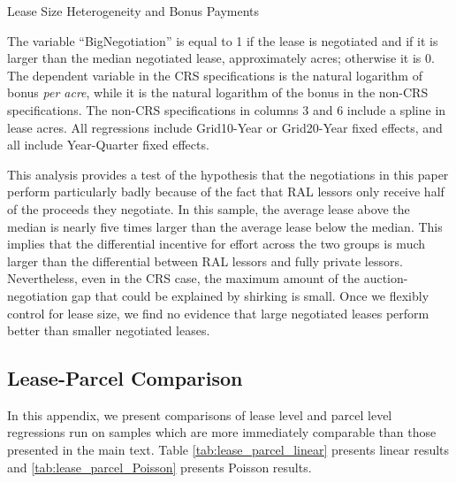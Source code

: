 \begin{appendices}
\addtolength{\tabcolsep}{5pt}
\begin{table}[H]
\begin{center}
\begin{threeparttable}
	\caption{Lease Size Heterogeneity and Bonus Payments}
	\label{tab:LeaseSizeHet}
 	\small
   	            
    \footnotesize
    \begin{tablenotes}
    	\item The variable ``BigNegotiation'' is equal to 1 if the lease is negotiated and if it is larger than the median negotiated lease, approximately  acres; otherwise it is 0.  The dependent variable in the CRS specifications is the natural logarithm of bonus \textit{per acre}, while it is the natural logarithm of the bonus in the non-CRS specifications.  The non-CRS specifications in columns 3 and 6 include a spline in lease acres. All regressions include Grid10-Year or Grid20-Year fixed effects, and all include Year-Quarter fixed effects.
    \end{tablenotes}
\end{threeparttable}
\end{center}
\end{table}

This analysis provides a test of the hypothesis that the negotiations in this paper perform particularly badly because of the fact that RAL lessors only receive half of the proceeds they negotiate. In this sample, the average lease above the median is nearly five times larger than the average lease below the median. This implies that the differential incentive for effort across the two groups is much larger than the differential between RAL lessors and fully private lessors. Nevertheless, even in the CRS case, the maximum amount of the auction-negotiation gap that could be explained by shirking is small. Once we flexibly control for lease size, we find no evidence that large negotiated leases perform better than smaller negotiated leases. 

\pagebreak

\subsection{Lease-Parcel Comparison}\label{app:lease-parcel-decomp}
In this appendix, we present comparisons of lease level and parcel level regressions run on samples which are more immediately comparable than those presented in the main text. Table \ref{tab:lease_parcel_linear} presents linear results and \ref{tab:lease_parcel_Poisson} presents Poisson results. 


\end{appendices}
